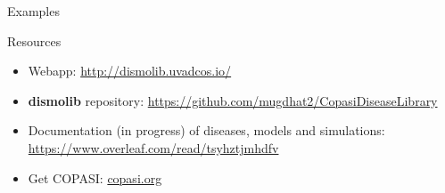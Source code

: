 \documentclass{beamer}
\begin{document}
\begin{frame}{Examples}
    
\end{frame}

\begin{frame}{Resources}
    \begin{itemize}
        \item Webapp: \url{ http://dismolib.uvadcos.io/}
        \item \textbf{dismolib} repository: \url{https://github.com/mugdhat2/CopasiDiseaseLibrary}
        \item Documentation (in progress) of diseases, models and simulations: \url{https://www.overleaf.com/read/tsyhztjmhdfv}
        \item Get COPASI: \url{copasi.org}
    \end{itemize}
\end{frame}
\end{document}
